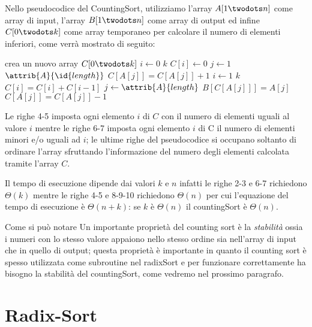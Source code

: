 Nello pseudocodice del CountingSort, utilizziamo l'array $A[1 \twodots n]$ come array
di input, l'array $B[1 \twodots n]$ come array di output ed infine $C[0 \twodots k]$
come array temporaneo per calcolare il numero di elementi inferiori, come verrà mostrato
di seguito:
\begin{codebox}
\li crea un nuovo array $C[0 \twodots k]$
\li \For $i \gets 0$ \To $k$
    \Do
\li               $C[i] \gets 0$
    \End
\li \For $j \gets 1$ \To $\attrib{A}{\id{length}}$
    \Do
\li               $C[A[j]] = C[A[j]] + 1$
    \End
\li \For $i \gets 1$ \To $k$
    \Do
\li         $C[i] = C[i] + C[i-1]$
    \End
\li \For $j \gets \attrib{A}{length}$ 
    \Do
\li         $B[C[A[j]]] = A[j]$
\li         $C[A[j]] = C[A[j]] - 1$
\end{codebox}
Le righe 4-5 imposta ogni elemento $i$ di $C$ con il numero di elementi
uguali al valore $i$ mentre le righe 6-7 imposta ogni elemento $i$ di C il numero di
elementi minori e/o uguali ad $i$; le ultime righe del pseudocodice si occupano
soltanto di ordinare l'array sfruttando l'informazione del numero degli elementi
calcolata tramite l'array $C$.

Il tempo di esecuzione dipende dai valori $k$ e $n$ infatti le righe 2-3 e 6-7 richiedono
$\Theta(k)$ mentre le righe 4-5 e 8-9-10 richiedono $\Theta(n)$ per cui l'equazione
del tempo di esecuzione è $\Theta(n + k)$: se $k$ è $\Theta(n)$ il countingSort
è $\Theta(n)$.

Come si può notare
Un importante proprietà del counting sort è la \emph{stabilità} ossia i numeri con
lo stesso valore appaiono nello stesso ordine sia nell'array di input che in quello
di output; questa proprietà è importante in quanto il counting sort è spesso utilizzata
come subroutine nel radixSort e per funzionare correttamente ha bisogno la stabilità
del countingSort, come vedremo nel prossimo paragrafo.

\section{Radix-Sort}
